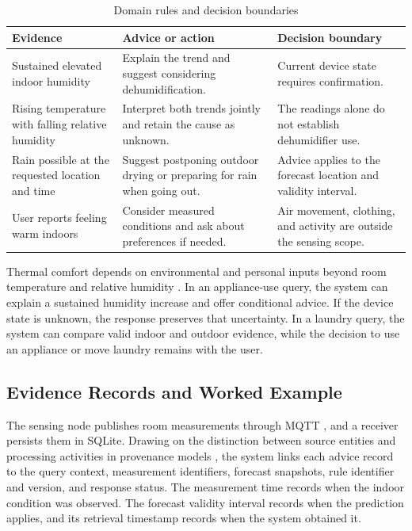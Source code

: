 \documentclass[conference]{IEEEtran}
\begin{document}
\begin{table}[t]
\caption{Domain rules and decision boundaries}
\label{tab:domain-rules}
\centering\footnotesize
\begin{tabular}{@{}p{}p{}p{}@{}}
\hline
Evidence & Advice or action & Decision boundary \\
\hline
Sustained elevated indoor humidity & Explain the trend and suggest considering dehumidification. & Current device state requires confirmation. \\
Rising temperature with falling relative humidity & Interpret both trends jointly and retain the cause as unknown. & The readings alone do not establish dehumidifier use. \\
Rain possible at the requested location and time & Suggest postponing outdoor drying or preparing for rain when going out. & Advice applies to the forecast location and validity interval. \\
User reports feeling warm indoors & Consider measured conditions and ask about preferences if needed. & Air movement, clothing, and activity are outside the sensing scope. \\
\hline
\end{tabular}
\end{table}

Thermal comfort depends on environmental and personal inputs beyond room temperature and relative humidity \cite{tartarini2020cbe}. In an appliance-use query, the system can explain a sustained humidity increase and offer conditional advice. If the device state is unknown, the response preserves that uncertainty. In a laundry query, the system can compare valid indoor and outdoor evidence, while the decision to use an appliance or move laundry remains with the user.

\subsection{Evidence Records and Worked Example}
The sensing node publishes room measurements through MQTT \cite{oasis2019mqtt}, and a receiver persists them in SQLite. Drawing on the distinction between source entities and processing activities in provenance models \cite{w3c2013provo}, the system links each advice record to the query context, measurement identifiers, forecast snapshots, rule identifier and version, and response status. The measurement time records when the indoor condition was observed. The forecast validity interval records when the prediction applies, and its retrieval timestamp records when the system obtained it.
\end{document}
